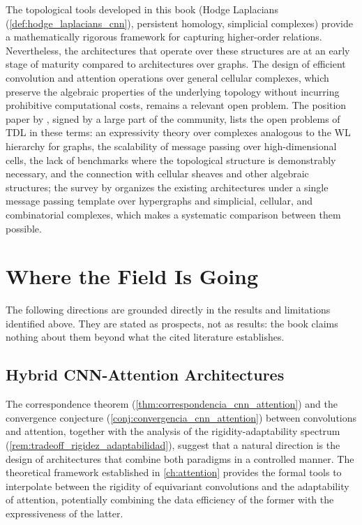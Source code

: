 The topological tools developed in this book (Hodge Laplacians (\autoref{def:hodge_laplacians_cnn}), persistent homology, simplicial complexes) provide a mathematically rigorous framework for capturing higher-order relations. Nevertheless, the architectures that operate over these structures are at an early stage of maturity compared to architectures over graphs. The design of efficient convolution and attention operations over general cellular complexes, which preserve the algebraic properties of the underlying topology without incurring prohibitive computational costs, remains a relevant open problem. The position paper by \citet{papamarkou2024tdlposition}, signed by a large part of the community, lists the open problems of \gls{TDL} in these terms: an expressivity theory over complexes analogous to the WL hierarchy for graphs, the scalability of message passing over high-dimensional cells, the lack of benchmarks where the topological structure is demonstrably necessary, and the connection with cellular sheaves and other algebraic structures; the survey by \citet{papillon2023tdlarchitectures} organizes the existing architectures under a single message passing template over hypergraphs and simplicial, cellular, and combinatorial complexes, which makes a systematic comparison between them possible.


\section{Where the Field Is Going}

The following directions are grounded directly in the results and limitations identified above. They are stated as prospects, not as results: the book claims nothing about them beyond what the cited literature establishes.

\subsection{Hybrid CNN-Attention Architectures}

The correspondence theorem (\autoref{thm:correspondencia_cnn_attention}) and the convergence conjecture (\autoref{conj:convergencia_cnn_attention}) between convolutions and attention, together with the analysis of the rigidity-adaptability spectrum (\autoref{rem:tradeoff_rigidez_adaptabilidad}), suggest that a natural direction is the design of architectures that combine both paradigms in a controlled manner. The theoretical framework established in \autoref{ch:attention} provides the formal tools to interpolate between the rigidity of equivariant convolutions and the adaptability of attention, potentially combining the data efficiency of the former with the expressiveness of the latter.

